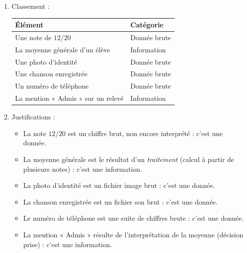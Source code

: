 \documentclass[11pt]{article}
\begin{document}
\begin{corrige}
\begin{enumerate}
\item Classement :
\begin{center}
\begin{tabularx}{\linewidth}{|l|X|}
\hline
\rowcolor{popblueL} Élément & Catégorie \\
\hline
Une note de $12/20$ & Donnée brute \\
\hline
La moyenne générale d'un élève & Information \\
\hline
Une photo d'identité & Donnée brute \\
\hline
Une chanson enregistrée & Donnée brute \\
\hline
Un numéro de téléphone & Donnée brute \\
\hline
La mention « Admis » sur un relevé & Information \\
\hline
\end{tabularx}
\end{center}
\item Justifications :
\begin{itemize}
\item La note $12/20$ est un chiffre brut, non encore interprété : c'est une donnée.
\item La moyenne générale est le résultat d'un \emph{traitement} (calcul à partir de plusieurs notes) : c'est une information.
\item La photo d'identité est un fichier image brut : c'est une donnée.
\item La chanson enregistrée est un fichier son brut : c'est une donnée.
\item Le numéro de téléphone est une suite de chiffres brute : c'est une donnée.
\item La mention « Admis » résulte de l'interprétation de la moyenne (décision prise) : c'est une information.
\end{itemize}
\end{enumerate}
\end{corrige}
\end{document}
